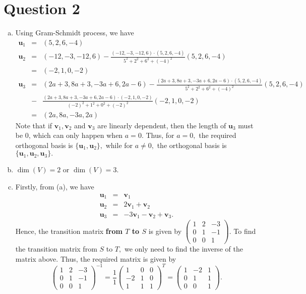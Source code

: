 \documentclass{article}
\begin{document}
\section*{Question 2}
\begin{enumerate}[(a)]
    \item Using Gram-Schmidt process, we have
    \begin{eqnarray*}
    \textbf{u}_1&=&(5,2,6,-4)\\
    \textbf{u}_2&=&(-12,-3,-12,6)-\frac{(-12,-3,-12,6)\cdot(5,2,6,-4)}{5^2+2^2+6^2+(-4)^2}(5,2,6,-4)\\
    &=&(-2,1,0,-2)\\
    \textbf{u}_3&=&(2a+3,8a+3,-3a+6,2a-6)-\frac{(2a+3,8a+3,-3a+6,2a-6)\cdot(5,2,6,-4)}{5^2+2^2+6^2+(-4)^2}(5,2,6,-4)\\
    &-&\frac{(2a+3,8a+3,-3a+6,2a-6)\cdot(-2,1,0,-2)}{(-2)^2+1^2+0^2+(-2)^2}(-2,1,0,-2)\\
    &=&(2a,8a,-3a,2a)
    \end{eqnarray*}
    Note that if $\textbf{v}_1,\textbf{v}_2$ and $\textbf{v}_3$ are linearly dependent, then the length of $\textbf{u}_3$ must be 0, which can only happen when $a=0.$ Thus, for $a=0,$ the required orthogonal basis is $\{\textbf{u}_1,\textbf{u}_2\},$ while for $a\neq0,$ the orthogonal basis is $\{\textbf{u}_1,\textbf{u}_2,\textbf{u}_3\}.$
    \item $\dim(V)=2$ or $\dim(V)=3.$
    \item Firstly, from (a), we have \begin{eqnarray*}
    \textbf{u}_1&=&\textbf{v}_1\\
    \textbf{u}_2&=&2\textbf{v}_1+\textbf{v}_2\\
    \textbf{u}_3&=&-3\textbf{v}_1-\textbf{v}_2+\textbf{v}_3.
    \end{eqnarray*}
    Hence, the transition matrix \textbf{from $T$ to $S$} is given by $\begin{pmatrix}1&2&-3\\0&1&-1\\0&0&1\end{pmatrix}.$ To find the transition matrix from $S$ to $T,$ we only need to find the inverse of the matrix above. Thus, the required matrix is given by $$\begin{pmatrix}1&2&-3\\0&1&-1\\0&0&1\end{pmatrix}^{-1}=\frac{1}{1}\begin{pmatrix}1&0&0\\-2&1&0\\1&1&1\end{pmatrix}^T=\begin{pmatrix}1&-2&1\\0&1&1\\0&0&1\end{pmatrix}.$$

\end{enumerate}
\end{document}
